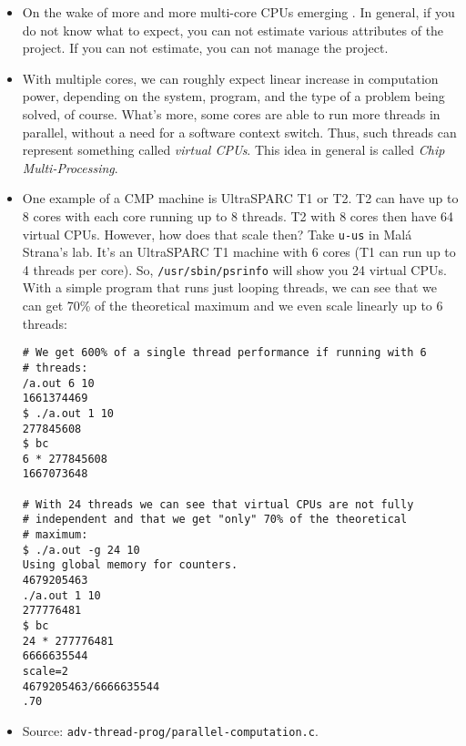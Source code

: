 \begin{itemize}
\item On the wake of more and more multi-core CPUs emerging . In general, if you do not know
what to expect, you can not estimate various attributes of the project. If you
can not estimate, you can not manage the project.
\item With multiple cores, we can roughly expect linear increase in computation
power, depending on the system, program, and the type of a problem being solved,
of course. What's more, some cores are able to run more threads in parallel,
without a need for a software context switch. Thus, such threads can represent
something called \emph{virtual CPUs}. This idea in general is called \emph{Chip
Multi-Processing}.
\item One example of a CMP machine is UltraSPARC T1 or T2. T2 can have up to 8
cores with each core running up to 8 threads. T2 with 8 cores then have 64
virtual CPUs. However, how does that scale then? Take \texttt{u-us} in Mal\'a
Strana's lab. It's an UltraSPARC T1 machine with 6 cores (T1 can run up to 4
threads per core). So, \texttt{/usr/sbin/psrinfo} will show you 24 virtual CPUs.
With a simple program that runs just looping threads, we can see that we can get
70\% of the theoretical maximum and we even scale linearly up to 6 threads:

\begin{verbatim}
# We get 600% of a single thread performance if running with 6
# threads:
/a.out 6 10
1661374469
$ ./a.out 1 10
277845608
$ bc
6 * 277845608
1667073648

# With 24 threads we can see that virtual CPUs are not fully
# independent and that we get "only" 70% of the theoretical
# maximum:
$ ./a.out -g 24 10
Using global memory for counters.
4679205463
./a.out 1 10
277776481
$ bc
24 * 277776481
6666635544
scale=2
4679205463/6666635544
.70
\end{verbatim}
\item Source: \texttt{adv-thread-prog/parallel-computation.c}.
\end{itemize}

\endinput

